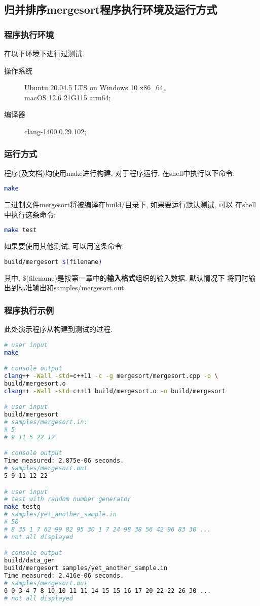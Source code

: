 \subsection{归并排序mergesort程序执行环境及运行方式}
\subsubsection{程序执行环境}
在以下环境下进行过测试.
\begin{description}
	\item[操作系统] Ubuntu 20.04.5 LTS on Windows 10 x86\_64, \\
		macOS 12.6 21G115 arm64;
	\item[编译器] clang-1400.0.29.102;
\end{description}

\subsubsection{运行方式}
程序(及文档)均使用make进行构建, 对于程序运行, 在shell中执行以下命令:
\begin{lstlisting}[language=bash]
make
\end{lstlisting}
二进制文件mergesort将被编译在build/目录下, 如果要运行默认测试, 可以
在shell中执行这条命令:
\begin{lstlisting}[language=bash]
make test
\end{lstlisting}
如果要使用其他测试, 可以用这条命令:
\begin{lstlisting}[language=bash]
build/mergesort $(filename)
\end{lstlisting}
其中, \$(filename)是按第一章中的\textbf{输入格式}组织的输入数据. 默认情况下
将同时输出到标准输出和samples/mergesort.out.

\subsubsection{程序执行示例}
此处演示程序从构建到测试的过程.
\begin{lstlisting}[language=bash]
# user input
make

# console output
clang++ -Wall -std=c++11 -c -g mergesort/mergesort.cpp -o \
build/mergesort.o
clang++ -Wall -std=c++11 build/mergesort.o -o build/mergesort

# user input
build/mergesort
# samples/mergesort.in:
# 5
# 9 11 5 22 12

# console output
Time measured: 2.875e-06 seconds.
# samples/mergesort.out
5 9 11 12 22 

# user input
# test with random number generator
make testg
# samples/yet_another_sample.in
# 50
# 8 35 1 7 62 99 82 95 30 1 7 24 98 38 56 42 96 83 30 ...
# not all displayed

# console output
build/data_gen
build/mergesort samples/yet_another_sample.in
Time measured: 2.416e-06 seconds.
# samples/mergesort.out
0 0 3 4 7 8 10 10 11 11 14 15 15 16 17 20 22 22 26 30 ...
# not all displayed
\end{lstlisting}

